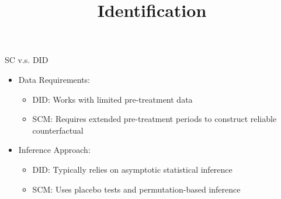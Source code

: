 \documentclass[dvipsnames,hyperref={pdfpagelabels=false}]{beamer}
\begin{document}
\begin{frame}{SC v.s. DID}{}
	\begin{itemize}
		
		
		
		
		
		\item Data Requirements:
										\vspace{0.2cm}
		\begin{itemize}
			\item DID: Works with limited pre-treatment data 
											\vspace{0.2cm}
			\item SCM: Requires extended pre-treatment periods to construct reliable counterfactual
		\end{itemize}
		\vspace{0.2cm}
		
		
		\item Inference Approach:
										\vspace{0.2cm}
		\begin{itemize}
			\item DID: Typically relies on asymptotic statistical inference
												\vspace{0.2cm}
			\item SCM: Uses placebo tests and permutation-based inference
		\end{itemize}
		\vspace{0.2cm}
		
		
		
		
	\end{itemize}
\end{frame}





\title[]  
{Identification}


\author 
{}

\institute{}






\date
{}


\begin{frame}{}
	\titlepage
\end{frame}
\end{document}
